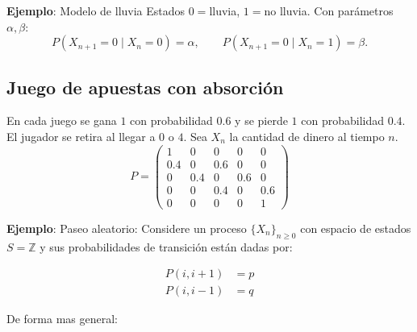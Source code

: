 \documentclass[12pt,a4paper]{article}
\begin{document}
\textbf{Ejemplo}: Modelo de lluvia
Estados $0=$lluvia, $1=$no lluvia. Con parámetros $\alpha,\beta$:
\begin{equation*}
P(X_{n+1}=0 \mid X_n=0)=\alpha, \qquad
P(X_{n+1}=0 \mid X_n=1)=\beta.
\end{equation*}

\subsection*{Juego de apuestas con absorción}
En cada juego se gana $1$ con probabilidad $0.6$ y se pierde $1$ con probabilidad $0.4$.
El jugador se retira al llegar a $0$ o $4$. Sea $X_n$ la cantidad de dinero al tiempo $n$.
\begin{equation*}
P=
\begin{pmatrix}
1 & 0 & 0 & 0 & 0\\
0.4 & 0 & 0.6 & 0 & 0\\
0 & 0.4 & 0 & 0.6 & 0\\
0 & 0 & 0.4 & 0 & 0.6\\
0 & 0 & 0 & 0 & 1
\end{pmatrix}
\end{equation*}
\begin{center}
\end{center}

\textbf{Ejemplo}: Paseo aleatorio: Considere un proceso $\{X_n\}_{n\ge 0}$ con espacio de estados $S=\mathbb{Z}$ y sus probabilidades de transición están dadas por:

\begin{align*}
    P(i,i+1) &= p \\
    P(i,i-1) &= q
\end{align*}

De forma mas general:
\end{document}
